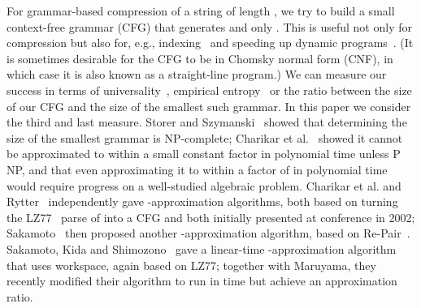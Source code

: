 \documentclass[runningheads]{llncs}
\begin{document}
For grammar-based compression of a string  of length , we try to build a small context-free grammar (CFG) that generates  and only .  This is useful not only for compression but also for, e.g., indexing~\cite{CN09,Lif07} and speeding up dynamic programs~\cite{LMWZ09}.  (It is sometimes desirable for the CFG to be in Chomsky normal form (CNF), in which case it is also known as a straight-line program.)  We can measure our success in terms of universality~\cite{KY00}, empirical entropy~\cite{NR08} or the ratio between the size of our CFG and the size  of the smallest such grammar.  In this paper we consider the third and last measure.  Storer and Szymanski~\cite{SS82} showed that determining the size of the smallest grammar is NP-complete; Charikar et al.~\cite{CLLP+05} showed it cannot be approximated to within a small constant factor in polynomial time unless P\,\,NP, and that even approximating it to within a factor of  in polynomial time would require progress on a well-studied algebraic problem.  Charikar et al. and Rytter~\cite{Ryt03} independently gave -approximation algorithms, both based on turning the LZ77~\cite{ZL77} parse of  into a CFG and both initially presented at conference in 2002; Sakamoto~\cite{Sak05} then proposed another -approximation algorithm, based on Re-Pair~\cite{LM00}.  Sakamoto, Kida and Shimozono~\cite{SKS04} gave a linear-time -approximation algorithm that uses  workspace, again based on LZ77; together with Maruyama, they~\cite{SMKS09} recently modified their algorithm to run in  time but achieve an  approximation ratio.
\end{document}
